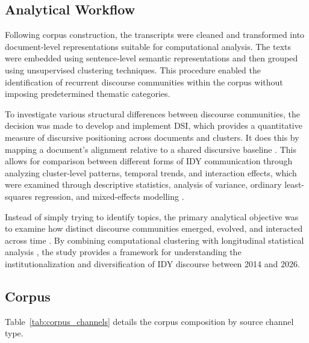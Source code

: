\documentclass[11pt]{article}
\begin{document}
\subsection{Analytical Workflow}

Following corpus construction, the transcripts were cleaned and transformed into document-level representations suitable for computational analysis. The texts were embedded using sentence-level semantic representations and then grouped using unsupervised clustering techniques. This procedure enabled the identification of recurrent discourse communities within the corpus without imposing predetermined thematic categories.

To investigate various structural differences between discourse communities, the decision was made to develop and implement DSI, which provides a quantitative measure of discursive positioning across documents and clusters. It does this by mapping a document's alignment relative to a shared discursive baseline \cite{paranyushkin2019,thimmanayakanapalya2025}. This allows for comparison between different forms of IDY communication through analyzing cluster-level patterns, temporal trends, and interaction effects, which were examined through descriptive statistics, analysis of variance, ordinary least-squares regression, and mixed-effects modelling \cite{gries2015,speelman2018}.

Instead of simply trying to identify topics, the primary analytical objective was to examine how distinct discourse communities emerged, evolved, and interacted across time \cite{brigadir2015,winter2016,desiderio2025}. By combining computational clustering with longitudinal statistical analysis \cite{teuling2025,huang2025}, the study provides a framework for understanding the institutionalization and diversification of IDY discourse between 2014 and 2026.

\subsection{Corpus}

Table~\ref{tab:corpus_channels} details the corpus composition by source channel type.
\end{document}

